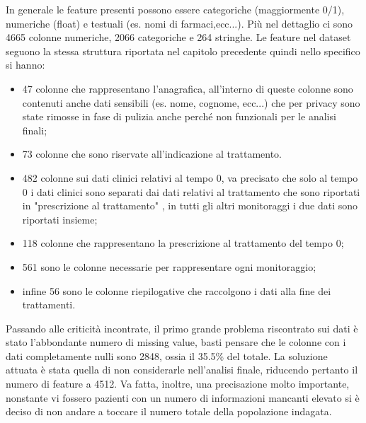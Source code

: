 In generale le feature presenti possono essere categoriche (maggiormente 0/1), numeriche (float) e testuali (es. nomi di farmaci,ecc...).  Più nel dettaglio ci sono 4665 colonne numeriche, 2066 categoriche e 264 stringhe.
Le feature nel dataset seguono la stessa struttura riportata nel capitolo precedente quindi nello specifico si hanno:
\begin{itemize}
	\item 47 colonne che rappresentano l'anagrafica, all'interno di queste colonne sono contenuti anche dati sensibili (es. nome, cognome, ecc...) che per privacy sono state rimosse in fase di pulizia anche perché non funzionali per le analisi finali;
	\item 73 colonne che sono riservate all'indicazione al trattamento.
	\item 482 colonne sui dati clinici relativi al tempo 0, va precisato che solo al tempo 0 i dati clinici sono separati dai dati relativi al trattamento che sono riportati in "prescrizione al trattamento" , in tutti gli altri monitoraggi i due dati sono riportati insieme;
	\item 118 colonne che rappresentano la prescrizione al trattamento del tempo 0;
	\item 561 sono le colonne necessarie per rappresentare ogni monitoraggio;
	\item infine 56 sono le colonne riepilogative che raccolgono i dati alla fine dei trattamenti. 
\end{itemize}

Passando alle criticità incontrate, il primo grande problema riscontrato sui dati è stato  l'abbondante numero di missing value, basti pensare che le colonne con i dati completamente nulli sono 2848, ossia il 35.5\% del totale.\newline
La soluzione attuata è stata quella di non considerarle nell'analisi finale, riducendo pertanto il numero di feature a 4512.\newline
Va fatta, inoltre, una precisazione molto importante, nonstante vi fossero pazienti con un numero di informazioni mancanti elevato si è deciso di non andare a toccare il numero totale della popolazione indagata.


